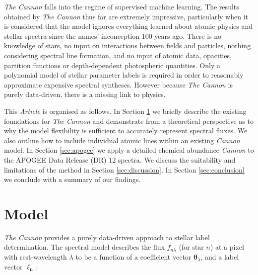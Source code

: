 \documentclass[useAMS,usenatbib]{mn2e}
\newcommand\article{\textit{Article}}
\newcommand\tc{\textit{The Cannon}}
\newcommand\lv{\mathbf{\boldsymbol\ell_n}}
\newcommand\cv{{\boldsymbol\theta}_\lambda}
\begin{document}

\tc{} falls into the regime of supervised machine learning. The results obtained by \tc{} thus far are extremely impressive, particularly when it is considered that the model ignores everything learned about atomic physics and stellar spectra since the names' inconception 100 years ago. There is no knowledge of stars, no input on interactions between fields and particles, nothing considering spectral line formation, and no input of atomic data, opacities, partition functions or depth-dependent photospheric quantities. Only a polynomial model of stellar parameter labels is required in order to reasonably approximate expensive spectral syntheses. However because \tc{} is purely data-driven, there is a missing link to physics.




This \article{} is organised as follows. In Section \ref{sec:model} we briefly describe the existing foundations for \tc{} and demonstrate from a theoretical perspective as to why the model flexibility is sufficient to accurately represent spectral fluxes. We also outline how to include individual atomic lines within an existing \textit{Cannon} model. In Section \ref{sec:apogee} we apply a detailed chemical abundance \textit{Cannon} to the APOGEE Data Release (DR) 12 spectra. We discuss the suitability and limitations of the method in Section \ref{sec:discussion}. In Section \ref{sec:conclusion} we conclude with a summary of our findings.

\section{Model}
\label{sec:model}

\tc{} provides a purely data-driven approach to stellar label determination. The
spectral model describes the flux $f_{n\lambda}$ (for star $n$) at a pixel with rest-wavelength $\lambda$ to be a function
of a coefficient vector $\cv$, and a label vector $\lv$:
\end{document}
